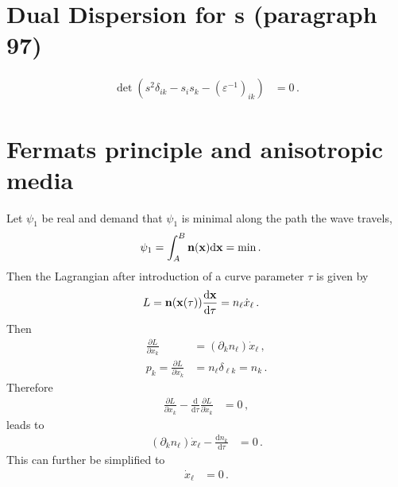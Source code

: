 \documentclass[a4paper,12pt]{article}
\newcommand{\vct}[1]{{\bf #1}}
\begin{document}
\section{Dual Dispersion for s (paragraph 97)}

\begin{align}
 \det(s^2 \delta_{ik} - s_i s_k - (\varepsilon^{-1})_{ik}) &= 0\,.
\end{align}


\section{Fermats principle and anisotropic media}

Let $\psi_1$ be real and demand that $\psi_1$ is minimal along the path the wave travels,
\begin{align}
 \psi_1 &= \int_A^B \vct{n}(\vct{x}) \text{d} \vct{x} = \text{min}\,.
\end{align}
Then the Lagrangian after introduction of a curve parameter $\tau$ is given by
\begin{align}
 L &= \vct{n}(\vct{x}(\tau)) \frac{\text{d}\vct{x}}{\text{d}\tau} = n_\ell \dot{x}_\ell\,.
\end{align}
Then
\begin{align}
 \frac{\partial L}{\partial x_k} &= (\partial_k n_\ell) \dot{x}_\ell\,,\\
 p_k = \frac{\partial L}{\partial \dot{x}_k} &= n_\ell \delta_{\ell k} = n_k\,. 
\end{align}
Therefore
\begin{align}
 \frac{\partial L}{\partial x_k} - \frac{\text{d}}{\text{d}\tau}\frac{\partial L}{\partial \dot{x}_k} &= 0\,,
\end{align}
leads to
\begin{align}
 (\partial_k n_\ell) \dot{x}_\ell - \frac{\text{d} n_k}{\text{d} \tau} &= 0\,.
\end{align}
This can further be simplified to
\begin{align}
 [(\partial_k n_\ell) - (\partial_\ell n_k)] \dot{x}_\ell &= 0\,.
\end{align}
\end{document}
